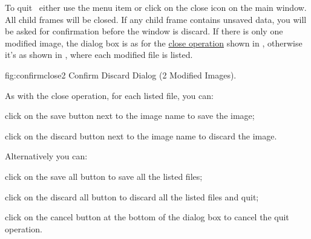 
To quit \FlowframTk\ either use the menu item
 or click on the close icon on the
main window. All child frames will be closed. If any child frame
contains unsaved data, you will be asked for confirmation before
the window is discard. If there is only one modified image, the
dialog box is as for the \hyperref[sec:closeimage]{close operation} shown in
, otherwise it's as shown in
, where each modified file is listed.

\FloatFig
  {fig:confirmclose2}
  {}
  {Confirm Discard Dialog (2 Modified Images).}

As with the close operation, for each listed file, you can:
\begin{deflist}

\begin{itemdesc}
click on the save button next to the image name to save the image;
\end{itemdesc}


\begin{itemdesc}
click on the discard button next to the image name to discard the
image.
\end{itemdesc}

\end{deflist}

Alternatively you can:
\begin{deflist}

\begin{itemdesc}
click on the save all button to save all the listed files;
\end{itemdesc}


\begin{itemdesc}
click on the discard all button to discard all the listed files and
quit;
\end{itemdesc}


\begin{itemdesc}
click on the cancel button at the bottom of the dialog box to cancel
the quit operation.
\end{itemdesc}

\end{deflist}

